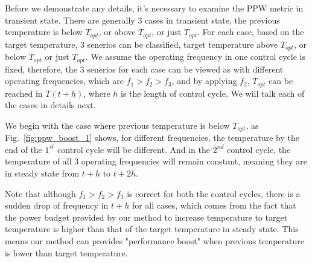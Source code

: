 Before we demonstrate any details, it's necessary to examine the PPW metric in transient state.
There are generally $3$ cases in transient state, the previous temperature is below $T_{opt}$, or above $T_{opt}$, or just $T_{opt}$. For each case, based on the target temperature, $3$ senerios can be classified, target temperature above $T_{opt}$, or below $T_{opt}$ or just $T_{opt}$. We assume the operating frequency in one control cycle is fixed, therefore, the $3$ senerios for each case can be viewed as with different operating frequencies, which are $f_{1}>f_{2}>f_{3}$, and by applying $f_{2}$, $T_{opt}$ can be reached in $T(t+h)$, where $h$ is the length of control cycle. We will talk each of the cases in details next.

We begin with the case where previous temperature is below $T_{opt}$, as Fig.~\ref{fig:ppw_boost_1} shows, for different frequencies, the temperature by the end of the $1^{st}$ control cycle will be different. And in the $2^{nd}$ control cycle, the temperature of all $3$ operating frequencies will remain constant, meaning they are in steady state from $t+h$ to $t+2h$.

Note that although $f_{1}>f_{2}>f_{3}$ is correct for both the control cycles, there is a sudden drop of frequency in $t+h$ for all cases, which comes from the fact that the power budget provided by our method to increase temperature to target temperature is higher than that of the target temperature in steady state. This means our method can provides "performance boost" when previous temperature is lower than target temperature.

